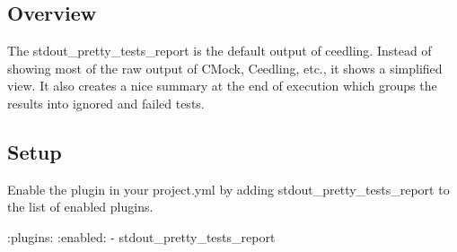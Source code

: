 \subsection*{Overview}

The stdout\+\_\+pretty\+\_\+tests\+\_\+report is the default output of ceedling. Instead of showing most of the raw output of C\+Mock, Ceedling, etc., it shows a simplified view. It also creates a nice summary at the end of execution which groups the results into ignored and failed tests.

\subsection*{Setup}

Enable the plugin in your project.\+yml by adding {\ttfamily stdout\+\_\+pretty\+\_\+tests\+\_\+report} to the list of enabled plugins.


\begin{DoxyCode}
:plugins:
  :enabled:
    - stdout\_pretty\_tests\_report
\end{DoxyCode}
 